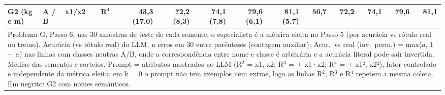 \begin{table}[htbp]
\begin{tabular}{llllrrrrrrrrrr}
G2 (kg e m) & A / B & x1/x2 & R$^4$ & 43,3 (17,0) & 72,2 (8,3) & 74,1 (7,8) & 79,6 (6,1) & 81,1 (5,7) & 56,7 & 72,2 & 74,1 & 79,6 & 81,1 \\
\bottomrule
\multicolumn{14}{p{0.95\linewidth}}{\footnotesize Problema G, Passo 6, nas 30 amostras de teste de cada semente; o especialista é a métrica eleita no Passo 5 (por acurácia vs rótulo real no treino). Acurácia (vs rótulo real) do LLM, n erros em 30 entre parênteses (contagem auxiliar); Acur.\ vs real (inv.\ perm.) = max($a$, 1 $-$ $a$) nas linhas com classes neutras A/B, onde a correspondência entre nome e classe é arbitrária e a acurácia literal pode sair invertida. Médias das sementes e sorteios. Prompt = atributos mostrados ao LLM (R$^2$ = x1, x2; R$^3$ = + x1·x2; R$^4$ = + x1², x2²), fator controlado e independente da métrica eleita; em k = 0 o prompt não tem exemplos nem extras, logo as linhas R$^2$, R$^3$ e R$^4$ repetem a mesma coleta. Em negrito: G2 com nomes semânticos.} \\
\end{tabular}
\end{table}
